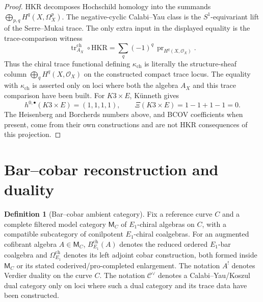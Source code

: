 \documentclass[11pt]{amsart}
\providecommand{\cC}{\mathcal{C}}
\providecommand{\cO}{\mathcal{O}}
\theoremstyle{definition}
\newtheorem{definition}[theorem]{Definition}
\theoremstyle{remark}
\begin{document}
\begin{proof}
HKR decomposes Hochschild homology into the summands
\(\bigoplus_{p,q} H^q(X,\Omega_X^p)\). The negative-cyclic Calabi--Yau
class is the \(S^1\)-equivariant lift of the Serre--Mukai trace. The
only extra input in the displayed equality is the trace-comparison
witness
\[
        \operatorname{tr}^{\mathrm{ch}}_{A_X}\circ\mathrm{HKR}
        =
        \sum_q(-1)^q\,\operatorname{pr}_{H^q(X,\cO_X)} .
\]
Thus the chiral trace functional defining \(\kappa_{\mathrm{ch}}\) is
literally the structure-sheaf column \(\bigoplus_q H^q(X,\cO_X)\) on the
constructed compact trace locus. The equality with
\(\kappa_{\mathrm{ch}}\) is asserted only on loci where both the algebra
\(A_X\) and this trace comparison have been built.
For \(K3\times E\), K\"unneth gives
\[
        h^{0,\bullet}(K3\times E)=(1,1,1,1),
        \qquad \Xi(K3\times E)=1-1+1-1=0 .
\]
The Heisenberg and Borcherds numbers above, and BCOV coefficients when
present, come from their own constructions and are not HKR consequences of
this projection.
\end{proof}

\section{Bar--cobar reconstruction and duality}

\begin{definition}[Bar--cobar ambient category]
Fix a reference curve \(C\) and a complete filtered model category
\(\mathsf{M}_C\) of \(E_1\)-chiral algebras on \(C\), with a compatible
subcategory of conilpotent \(E_1\)-chiral coalgebras. For an augmented
cofibrant algebra \(A\in\mathsf{M}_C\), \(B^{\mathrm{ch}}_{E_1}(A)\) denotes
the reduced ordered \(E_1\)-bar coalgebra and
\(\Omega^{\mathrm{ch}}_{E_1}\) denotes its left adjoint cobar construction,
both formed inside \(\mathsf{M}_C\) or its stated coderived/pro-completed
enlargement. The notation \(A^!\) denotes Verdier duality on the curve
\(C\). The notation \(\cC^\vee\) denotes a Calabi--Yau/Koszul dual category
only on loci where such a dual category and its trace data have been
constructed.
\end{definition}
\end{document}
